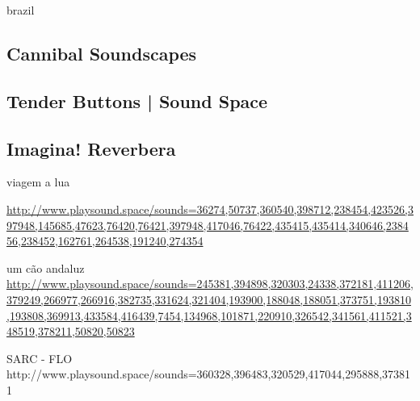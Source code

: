 \begin{otherlanguage*}{brazil}
\subsection{Cannibal Soundscapes}


\subsection{Tender Buttons | Sound Space}


\subsection{Imagina! Reverbera}


viagem a lua

\url{http://www.playsound.space/sounds=36274,50737,360540,398712,238454,423526,397948,145685,47623,76420,76421,397948,417046,76422,435415,435414,340646,238456,238452,162761,264538,191240,274354}


um cão andaluz
\url{http://www.playsound.space/sounds=245381,394898,320303,24338,372181,411206,379249,266977,266916,382735,331624,321404,193900,188048,188051,373751,193810,193808,369913,433584,416439,7454,134968,101871,220910,326542,341561,411521,348519,378211,50820,50823}


SARC - FLO
http://www.playsound.space/sounds=360328,396483,320529,417044,295888,373811


\end{otherlanguage*}


